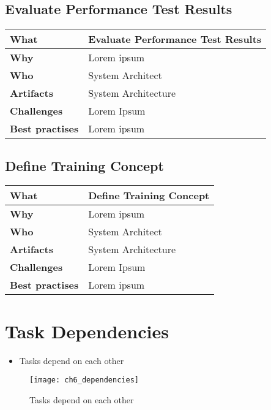 \subsection{Evaluate Performance Test Results}
 \label{table:ch6_Evaluate_Performance_Results}
\begin{tabular}
	{|m{3cm}|m{10cm}|} \hline \bfseries What & Evaluate Performance Test Results\\
	\hline \bfseries Why & Lorem ipsum\\
	\hline \bfseries Who & System Architect\\
	\hline \bfseries Artifacts & System Architecture\\
	\hline \bfseries Challenges & Lorem Ipsum\\
	\hline \bfseries Best practises & Lorem ipsum\\
	\hline 
\end{tabular}

\subsection{Define Training Concept}
 \label{table:ch6_Task_Define_Training_Concept}
\begin{tabular}
	{|m{3cm}|m{10cm}|} \hline \bfseries What & Define Training Concept\\
	\hline \bfseries Why & Lorem ipsum\\
	\hline \bfseries Who & System Architect\\
	\hline \bfseries Artifacts & System Architecture\\
	\hline \bfseries Challenges & Lorem Ipsum\\
	\hline \bfseries Best practises & Lorem ipsum\\
	\hline 
\end{tabular}

\section{Task Dependencies}

\begin{itemize}
	\item Tasks depend on each other
\end{itemize}

\begin{figure}
	[htpb] \centering 
	\texttt{[image: ch6\_dependencies]} 
	\caption{Tasks depend on each other} 
	\label{fig:ch6_dependencies} 
\end{figure}

